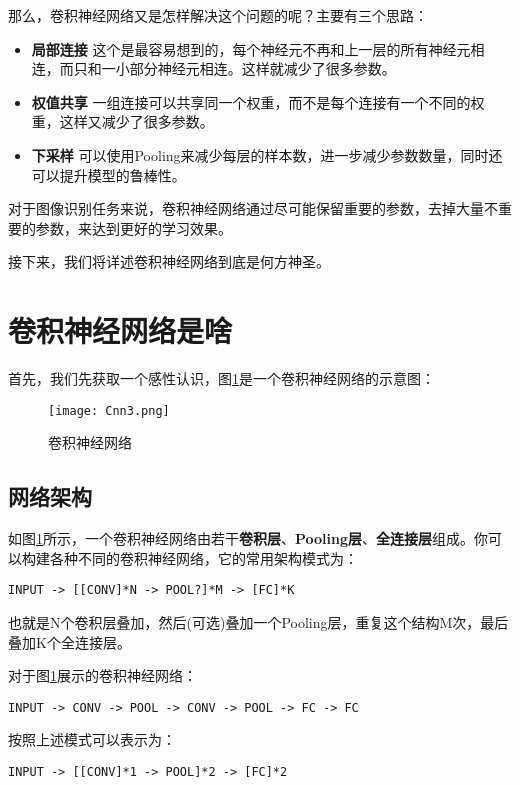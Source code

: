 那么，卷积神经网络又是怎样解决这个问题的呢？主要有三个思路：

\begin{itemize}
	\item
	      \textbf{局部连接}
	      这个是最容易想到的，每个神经元不再和上一层的所有神经元相连，而只和一小部分神经元相连。这样就减少了很多参数。
	\item
	      \textbf{权值共享}
	      一组连接可以共享同一个权重，而不是每个连接有一个不同的权重，这样又减少了很多参数。
	\item
	      \textbf{下采样}
	      可以使用Pooling来减少每层的样本数，进一步减少参数数量，同时还可以提升模型的鲁棒性。
\end{itemize}

对于图像识别任务来说，卷积神经网络通过尽可能保留重要的参数，去掉大量不重要的参数，来达到更好的学习效果。

接下来，我们将详述卷积神经网络到底是何方神圣。


\section{卷积神经网络是啥}\label{Cnn:3}
首先，我们先获取一个感性认识，图\ref{fig:Cnn3}是一个卷积神经网络的示意图：

\begin{figure}[htbp]
	\centering
	\texttt{[image: Cnn3.png]}
	\caption{卷积神经网络}
	\label{fig:Cnn3}
\end{figure}

\subsection{网络架构}

如图\ref{fig:Cnn3}所示，一个卷积神经网络由若干\textbf{卷积层}、\textbf{Pooling层}、\textbf{全连接层}组成。你可以构建各种不同的卷积神经网络，它的常用架构模式为：
\begin{lstlisting}[numbers=none]
    INPUT -> [[CONV]*N -> POOL?]*M -> [FC]*K
\end{lstlisting}

也就是N个卷积层叠加，然后(可选)叠加一个Pooling层，重复这个结构M次，最后叠加K个全连接层。

对于图\ref{fig:Cnn3}展示的卷积神经网络：
\begin{lstlisting}[numbers=none]
    INPUT -> CONV -> POOL -> CONV -> POOL -> FC -> FC
\end{lstlisting}

按照上述模式可以表示为：
\begin{lstlisting}[numbers=none]
    INPUT -> [[CONV]*1 -> POOL]*2 -> [FC]*2
\end{lstlisting}

